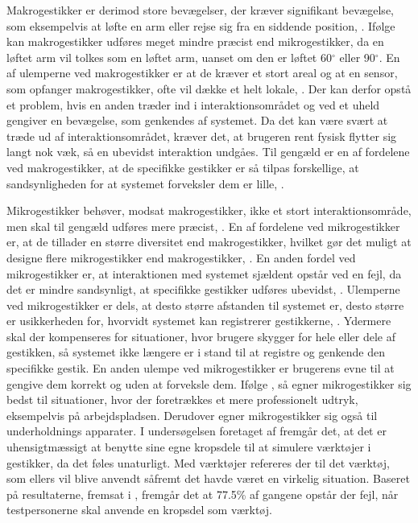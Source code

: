Makrogestikker er derimod store bevægelser, der kræver signifikant bevægelse, som eksempelvis at løfte en arm eller rejse sig fra en siddende position, \parencite[s. 6]{PDF:UsabilityofMicroVsMacroGestures}. Ifølge \textcite[s. 9]{PDF:UsabilityofMicroVsMacroGestures} kan makrogestikker udføres meget mindre præcist end mikrogestikker, da en løftet arm vil tolkes som en løftet arm, uanset om den er løftet 60$^{\circ}$ eller 90$^{\circ}$. En af ulemperne ved makrogestikker er at de kræver et stort areal og at en sensor, som opfanger makrogestikker, ofte vil dække et helt lokale, \parencite[s. 9]{PDF:UsabilityofMicroVsMacroGestures}. Der kan derfor opstå et problem, hvis en anden træder ind i interaktionsområdet og ved et uheld gengiver en bevægelse, som genkendes af systemet. Da det kan være svært at træde ud af interaktionsområdet, kræver det, at brugeren rent fysisk flytter sig langt nok væk, så en ubevidst interaktion undgåes. Til gengæld er en af fordelene ved makrogestikker, at de specifikke gestikker er så tilpas forskellige, at sandsynligheden for at systemet forveksler dem er lille, \parencite[s. 9]{PDF:UsabilityofMicroVsMacroGestures}.  

Mikrogestikker behøver, modsat makrogestikker, ikke et stort interaktionsområde, men skal til gengæld udføres mere præcist, \parencite[s. 10]{PDF:UsabilityofMicroVsMacroGestures}. En af fordelene ved mikrogestikker er, at de tillader en større diversitet end makrogestikker, hvilket gør det muligt at designe flere mikrogestikker end makrogestikker, \parencite[s. 10]{PDF:UsabilityofMicroVsMacroGestures}. En anden fordel ved mikrogestikker er, at interaktionen med systemet sjældent opstår ved en fejl, da det er mindre sandsynligt, at specifikke gestikker udføres ubevidst, \parencite[s. 10]{PDF:UsabilityofMicroVsMacroGestures}. Ulemperne ved mikrogestikker er dels, at desto større afstanden til systemet er, desto større er usikkerheden for, hvorvidt systemet kan registrerer gestikkerne, \parencite[s. 10]{PDF:UsabilityofMicroVsMacroGestures}. Ydermere skal der kompenseres for situationer, hvor brugere skygger for hele eller dele af gestikken, så systemet ikke længere er i stand til at registre og genkende den specifikke gestik. En anden ulempe ved mikrogestikker er brugerens evne til at gengive dem korrekt og uden at forveksle dem. Ifølge \textcite[s. 10]{PDF:UsabilityofMicroVsMacroGestures}, så egner mikrogestikker sig bedst til situationer, hvor der foretrækkes et mere professionelt udtryk, eksempelvis på arbejdspladsen. Derudover egner mikrogestikker sig også til underholdnings apparater.\blankline
%
I undersøgelsen foretaget af \textcite[s. 823]{PDF:UnderstandingNaturalness} fremgår det, at det er uhensigtmæssigt at benytte sine egne kropsdele til at simulere værktøjer i gestikker, da det føles unaturligt. Med værktøjer refereres der til det værktøj, som ellers vil blive anvendt såfremt det havde været en virkelig situation. Baseret på resultaterne, fremsat i \textcite[s. 823]{PDF:UnderstandingNaturalness}, fremgår det at 77.5\% af gangene opstår der fejl, når testpersonerne skal anvende en kropsdel som værktøj.

